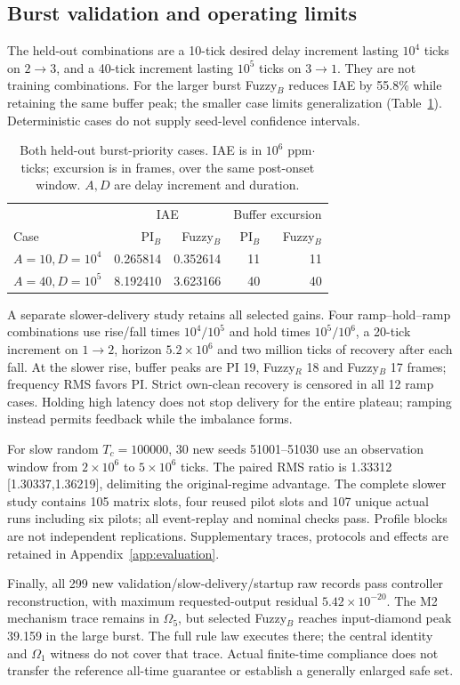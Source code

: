 \subsection{Burst validation and operating limits}
\label{subsec:eval_burst}
The held-out combinations are a 10-tick desired delay increment
lasting $10^4$ ticks on $2\to3$, and a 40-tick increment lasting
$10^5$ ticks on $3\to1$. They are not training combinations.
For the larger burst Fuzzy$_B$ reduces IAE by 55.8\% while retaining
the same buffer peak; the smaller case limits generalization
(Table~\ref{tab:eval_heldout_bursts}). Deterministic cases do not
supply seed-level confidence intervals.

\begin{table}[t]
\caption{Both held-out burst-priority cases. IAE is in $10^6$
ppm$\cdot$ticks; excursion is in frames, over the same post-onset window.
$A,D$ are delay increment and duration.}
\label{tab:eval_heldout_bursts}
\centering
\begin{tabular}{@{}lrrrr@{}}\toprule
 & \multicolumn{2}{c}{IAE} & \multicolumn{2}{c}{Buffer excursion}\\
Case & PI$_B$ & Fuzzy$_B$ & PI$_B$ & Fuzzy$_B$\\\midrule
$A=10,D=10^4$ & 0.265814 & 0.352614 & 11 & 11\\
$A=40,D=10^5$ & 8.192410 & 3.623166 & 40 & 40\\\bottomrule
\end{tabular}
\end{table}

A separate slower-delivery study retains all selected gains. Four
ramp--hold--ramp combinations use rise/fall times $10^4/10^5$ and
hold times $10^5/10^6$, a 20-tick increment on $1\to2$, horizon
$5.2\times10^6$ and two million ticks of recovery after each fall.
At the slower rise, buffer peaks are PI 19, Fuzzy$_R$ 18 and
Fuzzy$_B$ 17 frames; frequency RMS favors PI. Strict own-clean
recovery is censored in all 12 ramp cases. Holding high latency
does not stop delivery for the entire plateau; ramping instead
permits feedback while the imbalance forms.

For slow random $T_c=100000$, 30 new seeds 51001--51030 use
an observation window from $2\times10^6$ to $5\times10^6$ ticks.
The paired RMS ratio is 1.33312
[1.30337,1.36219], delimiting the original-regime advantage.
The complete slower study contains 105 matrix slots, four reused
pilot slots and 107 unique actual runs including six pilots; all
event-replay and nominal checks pass. Profile blocks are not
independent replications. Supplementary traces, protocols and
effects are retained in Appendix~\ref{app:evaluation}.

Finally, all 299 new validation/slow-delivery/startup raw records
pass controller reconstruction, with maximum requested-output
residual $5.42\times10^{-20}$. The M2 mechanism trace remains in
$\Omega_5$, but selected Fuzzy$_B$ reaches input-diamond peak
39.159 in the large burst. The full rule law executes there;
the central identity and $\Omega_1$ witness do not cover that trace.
Actual finite-time compliance does not transfer the reference
all-time guarantee or establish a generally enlarged safe set.
